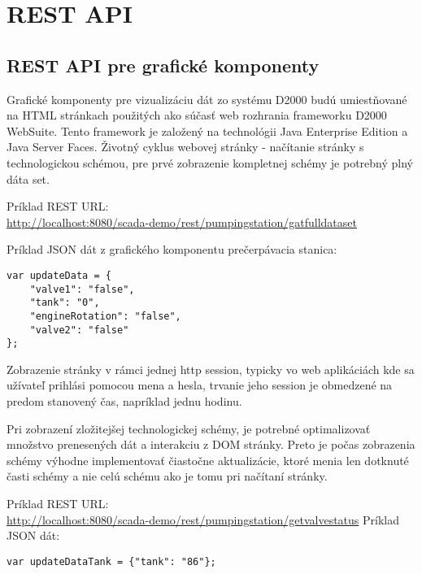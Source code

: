 \chapter{REST API}

\section{REST API pre grafické komponenty}
Grafické komponenty pre vizualizáciu dát zo systému D2000 budú umiestňované na HTML stránkach použitých ako súčasť web rozhrania frameworku D2000 WebSuite. Tento framework je založený na technológii Java Enterprise Edition a Java Server Faces. Životný cyklus webovej stránky - načítanie stránky s technologickou schémou, pre prvé zobrazenie kompletnej schémy je potrebný plný dáta set.


Príklad REST URL:\\
\url{http://localhost:8080/scada-demo/rest/pumpingstation/gatfulldataset}


Príklad JSON dát z grafického komponentu prečerpávacia stanica: 
\begin{lstlisting}
var updateData = {
	"valve1": "false",
	"tank": "0",
	"engineRotation": "false",
	"valve2": "false"
};
\end{lstlisting}


Zobrazenie stránky v rámci jednej http session, typicky vo web aplikáciách kde sa užívateľ prihlási pomocou mena a hesla, trvanie jeho session je obmedzené na predom stanovený čas, napríklad jednu hodinu.


Pri zobrazení zložitejšej technologickej schémy, je potrebné optimalizovať množstvo prenesených dát a interakciu z DOM stránky. Preto je počas zobrazenia schémy výhodne implementovať čiastočne aktualizácie, ktoré menia len dotknuté časti schémy a nie celú schému ako je tomu pri načítaní stránky.  

Príklad REST URL:\\ 
\url{http://localhost:8080/scada-demo/rest/pumpingstation/getvalvestatus}
Príklad \acs{JSON} dát:
\begin{lstlisting}
var updateDataTank = {"tank": "86"};
\end{lstlisting}
%


